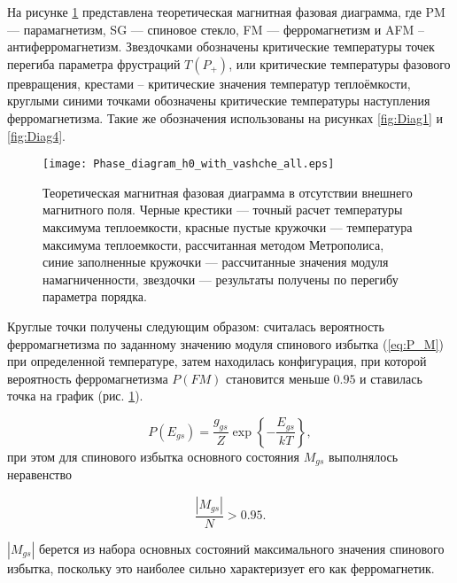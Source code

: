 На рисунке \ref{fig:Diag} представлена теоретическая магнитная фазовая диаграмма, где PM --- парамагнетизм, SG --- спиновое стекло, FM --- ферромагнетизм и AFM -- антиферромагнетизм. Звездочками обозначены критические температуры точек перегиба параметра фрустраций $T(P_{+})$, или критические температуры фазового превращения, крестами -- критические значения температур теплоёмкости, круглыми синими точками обозначены критические температуры наступления ферромагнетизма. Такие же обозначения использованы на рисунках \ref{fig:Diag1} и \ref{fig:Diag4}.

\begin{figure}[!ht]
	\centering
	\texttt{[image: Phase\_diagram\_h0\_with\_vashche\_all.eps]}
	\caption{Теоретическая магнитная фазовая диаграмма в отсутствии внешнего магнитного поля. Черные крестики --- точный расчет температуры максимума теплоемкости, красные пустые кружочки --- температура максимума теплоемкости, рассчитанная методом Метрополиса, синие заполненные кружочки ---  рассчитанные значения модуля намагниченности, звездочки --- результаты получены по перегибу параметра порядка.}
	\label{fig:Diag}
\end{figure}

Круглые точки получены следующим образом: считалась вероятность ферромагнетизма по заданному значению модуля спинового избытка (\ref{eq:P_M}) при определенной температуре, затем находилась конфигурация, при которой вероятность ферромагнетизма $P(FM)$ становится меньше $0.95$ и ставилась точка на график (рис. \ref{fig:Diag}).

\begin{equation}
	P(E_{gs}) =\frac{g_{gs}}{Z} \exp\left\{-\frac{E_{gs}}{kT}\right\},
	\label{eq:P_M}
\end{equation}
при этом для спинового избытка основного состояния $M_{gs}$ выполнялось неравенство

\begin{equation}
	\frac{|M_{gs}|}{N} > 0.95.
	\label{eq:M/N}
\end{equation}

$|M_{gs}|$ берется из набора основных состояний максимального значения спинового избытка, поскольку это наиболее сильно характеризует его как ферромагнетик.

